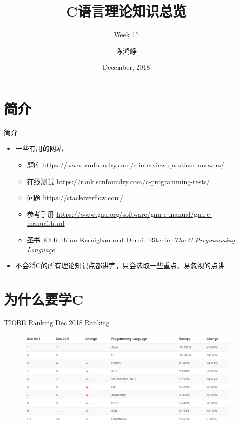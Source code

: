 \documentclass{myslide}
\title{C语言理论知识总览}
\subtitle{Week 17}
\author[chhzh123]{陈鸿峥}
\date[Dec, 2018]{December, 2018}
\begin{document}
\begin{frame}
\titlepage
\end{frame}

\begin{frame}
\tableofcontents[subsectionstyle=show]
\end{frame}

\section{简介}
\begin{frame}
\sectionpage
\end{frame}

\begin{frame}{简介}
\begin{itemize}
	\item 一些有用的网站
		\begin{itemize}
			\item 题库 \url{https://www.sanfoundry.com/c-interview-questions-answers/}
			\item 在线测试 \url{https://rank.sanfoundry.com/c-programming-tests/}
			\item 问题 \url{https://stackoverflow.com/}
			\item 参考手册 \url{https://www.gnu.org/software/gnu-c-manual/gnu-c-manual.html}
			\item 圣书 K\&R Brian Kernighan and Dennis Ritchie, \emph{The C Programming Language}
		\end{itemize}
	\item 不会将C的所有理论知识点都讲完，只会选取一些重点、易忽视的点讲
\end{itemize}
\end{frame}

\section{为什么要学C}
\begin{frame}
\sectionpage
\end{frame}

\begin{frame}{TIOBE Ranking}
Dec 2018 Ranking
\begin{figure}
\centering
\includegraphics[width=\linewidth]{fig/TIOBE.PNG}
\end{figure}
\end{frame}
\end{document}
